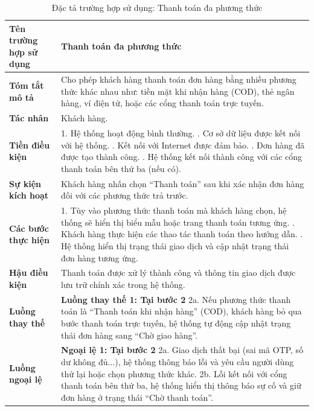 \begin{longtable}{|>{\bfseries}p{4cm}|p{11.5cm}|}
\caption{Đặc tả trường hợp sử dụng: Thanh toán đa phương thức}
\label{tab:uc-multipayment} \\
\hline
\textbf{Tên trường hợp sử dụng} & Thanh toán đa phương thức \\
\hline
\textbf{Tóm tắt mô tả} & Cho phép khách hàng thanh toán đơn hàng bằng nhiều phương thức khác nhau như: tiền mặt khi nhận hàng (COD), thẻ ngân hàng, ví điện tử, hoặc các cổng thanh toán trực tuyến. \\
\hline
\textbf{Tác nhân} & Khách hàng. \\
\hline
\textbf{Tiền điều kiện} & 1. Hệ thống hoạt động bình thường. \newline
2. Cơ sở dữ liệu được kết nối với hệ thống. \newline
3. Kết nối với Internet được đảm bảo. \newline
4. Đơn hàng đã được tạo thành công. \newline
5. Hệ thống kết nối thành công với các cổng thanh toán bên thứ ba (nếu có). \\
\hline
\textbf{Sự kiện kích hoạt} & Khách hàng nhấn chọn “Thanh toán” sau khi xác nhận đơn hàng đối với các phương thức trả trước. \\
\hline
\textbf{Các bước thực hiện} & 1. Tùy vào phương thức thanh toán mà khách hàng chọn, hệ thống sẽ hiển thị biểu mẫu hoặc trang thanh toán tương ứng. \newline
2. Khách hàng thực hiện các thao tác thanh toán theo hướng dẫn. \newline
3. Hệ thống hiển thị trạng thái giao dịch và cập nhật trạng thái đơn hàng tương ứng. \\
\hline
\textbf{Hậu điều kiện} & Thanh toán được xử lý thành công và thông tin giao dịch được lưu trữ chính xác trong hệ thống. \\
\hline
\textbf{Luồng thay thế} & \textbf{Luồng thay thế 1: Tại bước 2} \newline
2a. Nếu phương thức thanh toán là “Thanh toán khi nhận hàng” (COD), khách hàng bỏ qua bước thanh toán trực tuyến, hệ thống tự động cập nhật trạng thái đơn hàng sang “Chờ giao hàng”. \\
\hline
\textbf{Luồng ngoại lệ} & \textbf{Ngoại lệ 1: Tại bước 2} \newline
2a. Giao dịch thất bại (sai mã OTP, số dư không đủ...), hệ thống thông báo lỗi và yêu cầu người dùng thử lại hoặc chọn phương thức khác. \newline
2b. Lỗi kết nối với cổng thanh toán bên thứ ba, hệ thống hiển thị thông báo sự cố và giữ đơn hàng ở trạng thái “Chờ thanh toán”. \\
\hline
\end{longtable}

